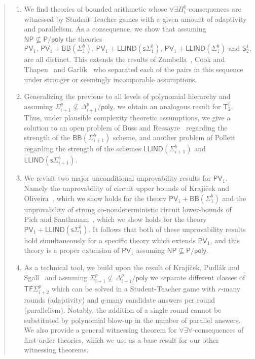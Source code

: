 \documentclass[11pt]{article}
\newcommand{\poly}{\mathsf{poly}}
\renewcommand{\P}{\mathsf{P}}
\newcommand{\NP}{\mathsf{NP}}
\newcommand{\PV}{\mathsf{PV}}
\theoremstyle{definition}
\theoremstyle{definition}
\theoremstyle{remark}
\begin{document}
\begin{abstract}
\begin{enumerate}[label=(\alph*)]
    \item\label{bulletPVBB} We find theories of bounded arithmetic whose $\forall\exists \Pi^b_i$-consequences are witnessed by Student-Teacher games with a given amount of adaptivity and parallelism. As a consequence, we show that assuming $\NP\not\subseteq \P/\poly$ the theories 
    \[\text{$\PV_1$, $\PV_1+\mathsf{BB}(\Sigma^b_1)$, $\PV_1+\mathsf{LLIND}(\mathsf{s}\Sigma^b_1)$, $\PV_1+\mathsf{LLIND}(\Sigma^b_1)$ and $\mathsf{S}^1_2$,}\]
    are all distinct. This extends the results of Zambella~\cite{Zambella96}, Cook and Thapen~\cite{DBLP:journals/tocl/CookT06} and Garlík~\cite{garlik2015model} who separated each of the pairs in this sequence under stronger or seemingly incomparable assumptions.
    \item Generalizing the previous to all levels of polynomial hierarchy and assuming $\Sigma^p_{i+1}\not\subseteq \Delta^p_{i+1}/\poly$, we obtain an analogous result for $\mathsf{T}^i_2$. Thus, under plausible complexity theoretic assumptions, we give a solution to an open problem of Buss and Ressayre~\cite{buss1985bounded,clote1993open} regarding the strength of the $\mathsf{BB}(\Sigma^b_{i+1})$ scheme, and another problem of Pollett~\cite{pollett1997arithmetic} regarding the strength of the schemes $\mathsf{LLIND}(\Sigma^b_{i+1})$ and $\mathsf{LLIND}(\mathsf{s}\Sigma^b_{i+1})$.
    \item We revisit two major unconditional unprovability results for $\PV_1$. Namely the unprovability of circuit upper bounds of Krajíček and Oliveira~\cite{KO17}, which we show holds for the theory $\PV_1+\mathsf{BB}(\Sigma^b_1)$ and the unprovability of strong co-nondeterministic circuit lower-bounds of Pich and Santhanam~\cite{pichS21}, which we show holds for the theory $\PV_1+\mathsf{LLIND}(\mathsf{s}\Sigma^b_1)$.  It follows that both of these unprovability results hold simultaneously for a specific theory which extends $\PV_1$, and this theory is a proper extension of $\PV_1$ assuming $\NP\not\subseteq \P/\poly$.
    \item As a technical tool, we build upon the result of Krajíček, Pudlák and Sgall~\cite{KrajicekPS90} and assuming $\Sigma^p_{i+1}\not\subseteq \Delta^p_{i+1}/\poly$ we separate different classes of $\mathsf{TF}\Sigma^p_{i+2}$ which can be solved in a Student-Teacher game with $r$-many rounds (adaptivity) and $q$-many candidate answers per round (parallelism). Notably, the addition of a single round cannot be substituted by polynomial blow-up in the number of parallel answers. We also provide a general witnessing theorem for $\forall\exists\forall$-consequences of first-order theories, which we use as a base result for our other witnessing theorems.
\end{enumerate}
\end{abstract}
\end{document}
